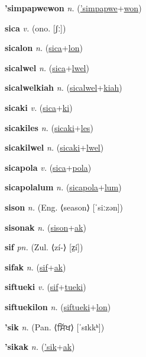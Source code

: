 \textbf{\hypertarget{'simpapwewon}{'simpapwewon}} \textit{n.} (\hyperlink{'simpapwe}{'simpapwe}+\allowbreak \hyperlink{won}{won})


\textbf{\hypertarget{sica}{sica}} \textit{v.} (ono. [ʃː])


\textbf{\hypertarget{sicalon}{sicalon}} \textit{n.} (\hyperlink{sica}{sica}+\allowbreak \hyperlink{lon}{lon})


\textbf{\hypertarget{sicalwel}{sicalwel}} \textit{n.} (\hyperlink{sica}{sica}+\allowbreak \hyperlink{lwel}{lwel})


\textbf{\hypertarget{sicalwelkiah}{sicalwelkiah}} \textit{n.} (\hyperlink{sicalwel}{sicalwel}+\allowbreak \hyperlink{kiah}{kiah})


\textbf{\hypertarget{sicaki}{sicaki}} \textit{v.} (\hyperlink{sica}{sica}+\allowbreak \hyperlink{ki}{ki})


\textbf{\hypertarget{sicakiles}{sicakiles}} \textit{n.} (\hyperlink{sicaki}{sicaki}+\allowbreak \hyperlink{les}{les})


\textbf{\hypertarget{sicakilwel}{sicakilwel}} \textit{n.} (\hyperlink{sicaki}{sicaki}+\allowbreak \hyperlink{lwel}{lwel})


\textbf{\hypertarget{sicapola}{sicapola}} \textit{v.} (\hyperlink{sica}{sica}+\allowbreak \hyperlink{pola}{pola})


\textbf{\hypertarget{sicapolalum}{sicapolalum}} \textit{n.} (\hyperlink{sicapola}{sicapola}+\allowbreak \hyperlink{lum}{lum})


\textbf{\hypertarget{sison}{sison}} \textit{n.} (Eng. ⟨season⟩ [ˈsiːzən])


\textbf{\hypertarget{sisonak}{sisonak}} \textit{n.} (\hyperlink{sison}{sison}+\allowbreak \hyperlink{ak}{ak})


\textbf{\hypertarget{sif}{sif}} \textit{pn.} (Zul. ⟨zí-⟩ [z̤í])


\textbf{\hypertarget{sifak}{sifak}} \textit{n.} (\hyperlink{sif}{sif}+\allowbreak \hyperlink{ak}{ak})


\textbf{\hypertarget{siftueki}{siftueki}} \textit{v.} (\hyperlink{sif}{sif}+\allowbreak \hyperlink{tueki}{tueki})


\textbf{\hypertarget{siftuekilon}{siftuekilon}} \textit{n.} (\hyperlink{siftueki}{siftueki}+\allowbreak \hyperlink{lon}{lon})


\textbf{\hypertarget{'sik}{'sik}} \textit{n.} (Pan. ⟨{\gurmukhi{}ਸਿੱਖ}⟩ [ˈsɪkkʰ])


\textbf{\hypertarget{'sikak}{'sikak}} \textit{n.} (\hyperlink{'sik}{'sik}+\allowbreak \hyperlink{ak}{ak})


